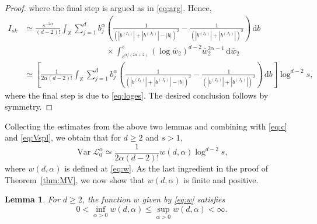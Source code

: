 \documentclass[11pt,reqno]{amsart}
\numberwithin{equation}{section}
\newtheorem{lemma}[theorem]{Lemma}
\theoremstyle{definition}
\newcommand{\XX}{\mathbb{X}}
\newcommand{\diff}{{\,\mathrm d}}
\DeclareMathOperator{\Var}{Var}
\begin{document}
\begin{proof}
where the final step is argued as in \eqref{eq:arg}. Hence,
\begin{align*}
	I_{sk}&\simeq \frac{s^{-2\alpha}}{(d-2)!} \int_{\XX } \sum_{j=1}^d b_j^{\alpha} \left(\frac{1}{(|b^{(I_k)}| + |b^{(J_k)}|-|b|)^{2}}  - \frac{1}{(|b^{(I_k)}| + |b^{(J_k)}|)^{2}}\right) \diff b \nonumber\\ 
	& \qquad \qquad \qquad \qquad \qquad\times \int_{s^{\alpha/(2\alpha+2)}}^s (\log \bar w_2)^{d-2}  \bar w_2^{2\alpha-1}  \diff \bar w_2\\
	& \simeq \left[\frac{1}{2\alpha(d-2)!} \int_{\XX } \sum_{j=1}^d b_j^{\alpha} \left(\frac{1}{(|b^{(I_k)}| + |b^{(J_k)}|-|b|)^{2}}  - \frac{1}{(|b^{(I_k)}| + |b^{(J_k)}|)^{2}}\right)\diff b \right] \log^{d-2} s,
\end{align*}
where the final step is due to \eqref{eq:loges}. The desired conclusion follows by symmetry.
\end{proof}

Collecting the estimates from the above two lemmas and combining with \eqref{eq:c} and \eqref{eq:Vspl}, we obtain that for $d \ge 2$ and $s >1$,
\begin{equation}\label{eq:var}
	\Var{\mathscr{L}_0^{\alpha}} \simeq \frac{1}{2\alpha(d-2)!} w(d,\alpha) \log^{d-2} s,
\end{equation}
where $w(d,\alpha)$ is defined at \eqref{eq:w}. As the last ingredient in the proof of Theorem~\ref{thm:MV}, we now show that $w(d,\alpha)$ is finite and positive.

\begin{lemma}\label{lem:wa} For $d \ge 2$, the function $w$ given by \eqref{eq:w}
	satisfies 
	$$
	0<\inf_{\alpha>0} w(d,\alpha)\le \sup_{\alpha>0} w(d,\alpha)<\infty.
	$$
\end{lemma}
\end{document}
